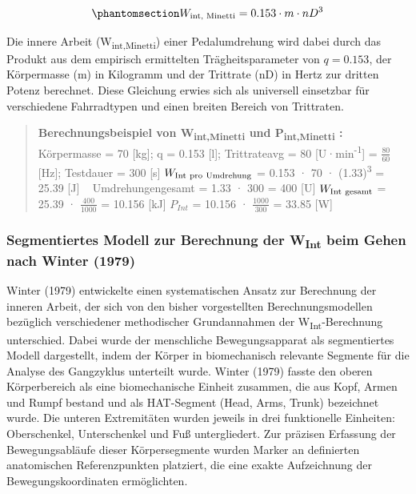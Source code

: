 \documentclass[
  letterpaper,
  DIV=11]{scrartcl}
\begin{document}
\begin{equation}\phantomsection\label{eq-Minetti}{
W_{\text{int, Minetti}} = 0.153 \cdot m \cdot nD^3
}\end{equation}

Die innere Arbeit (W\textsubscript{int,Minetti}) einer Pedalumdrehung
wird dabei durch das Produkt aus dem empirisch ermittelten
Trägheitsparameter von \(q = 0.153\), der Körpermasse (m) in Kilogramm
und der Trittrate (nD) in Hertz zur dritten Potenz berechnet. Diese
Gleichung erwies sich als universell einsetzbar für verschiedene
Fahrradtypen und einen breiten Bereich von Trittraten.

\begin{quote}
\textbf{Berechnungsbeispiel von W\textsubscript{int,Minetti} und
P\textsubscript{int,Minetti} :} Körpermasse = 70 {[}kg{]}; q = 0.153
{[}l{]}; Trittrateavg = 80 {[}U·min\textsuperscript{-1}{]} =
\(\frac{80}{60}\) {[}Hz{]}; Testdauer = 300 {[}s{]}
\(W_{\text{Int \kern0.05em pro \kern0.05em Umdrehung}}\) = 0.153 · 70 ·
(1.33)\textsuperscript{3} = 25.39 {[}J{]} ~ \textbar{} Umdrehungengesamt
= 1.33 · 300 = 400 {[}U{]} \(W_{\text{Int \kern0.05em gesamt}}\) = 25.39
· \(\frac{400}{1000}\) = 10.156 {[}kJ{]} \(P_{Int}\) = 10.156 ·
\(\frac{1000}{300}\) = 33.85 {[}W{]}
\end{quote}

\subsubsection{\texorpdfstring{Segmentiertes Modell zur Berechnung der
W\textsubscript{Int} beim Gehen nach Winter
(1979)}{Segmentiertes Modell zur Berechnung der WInt beim Gehen nach Winter (1979)}}\label{segmentiertes-modell-zur-berechnung-der-wint-beim-gehen-nach-winter-1979}

Winter (1979) entwickelte einen systematischen Ansatz zur Berechnung der
inneren Arbeit, der sich von den bisher vorgestellten
Berechnungsmodellen bezüglich verschiedener methodischer Grundannahmen
der W\textsubscript{Int}-Berechnung unterschied. Dabei wurde der
menschliche Bewegungsapparat als segmentiertes Modell dargestellt, indem
der Körper in biomechanisch relevante Segmente für die Analyse des
Gangzyklus unterteilt wurde. Winter (1979) fasste den oberen
Körperbereich als eine biomechanische Einheit zusammen, die aus Kopf,
Armen und Rumpf bestand und als HAT-Segment (Head, Arms, Trunk)
bezeichnet wurde. Die unteren Extremitäten wurden jeweils in drei
funktionelle Einheiten: Oberschenkel, Unterschenkel und Fuß
untergliedert. Zur präzisen Erfassung der Bewegungsabläufe dieser
Körpersegmente wurden Marker an definierten anatomischen Referenzpunkten
platziert, die eine exakte Aufzeichnung der Bewegungskoordinaten
ermöglichten.
\end{document}
